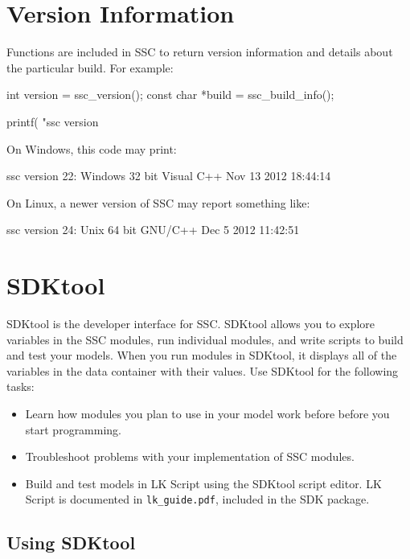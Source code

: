 \documentclass{scrartcl} %
\newcommand{\+}{\discretionary{\mbox{\scriptsize$\hookleftarrow$}}{}{}}
\begin{document}
\section{Version Information}

Functions are included in SSC to return version information and details about the particular build.  For example:

\begin{verbatimtab}[4]
int version = ssc_version();
const char *build = ssc_build_info();

printf( "ssc version %
\end{verbatimtab}

On Windows, this code may print:

\begin{verbatimtab}[4]
	ssc version 22: Windows 32 bit Visual C++ Nov 13 2012 18:44:14
\end{verbatimtab}

On Linux, a newer version of SSC may report something like:
\begin{verbatimtab}[4]
	ssc version 24: Unix 64 bit GNU/C++ Dec  5 2012 11:42:51
\end{verbatimtab}

\section{SDKtool}
\label{sec_sdktool}

SDKtool is the developer interface for SSC.  SDKtool allows you to explore variables in the SSC modules, run individual modules, and write scripts to build and test your models. When you run modules in SDKtool, it displays all of the variables in the data container with their values. Use SDKtool for the following tasks:

\begin{itemize}
\item Learn how modules you plan to use in your model work before before you start programming.
\item Troubleshoot problems with your implementation of SSC modules.
\item Build and test models in LK Script using the SDKtool script editor. LK Script is documented in \texttt{lk\_guide.pdf}, included in the SDK package.
\end{itemize}

\subsection{Using SDKtool}
\label{sec_sdktool_run}
\end{document}
